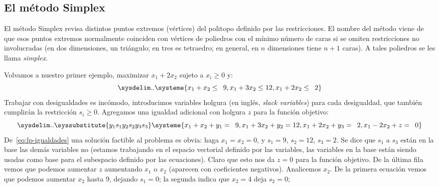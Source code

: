 \subsection{El método Simplex}
\label{sec:simplex}

  El método Simplex revisa distintos puntos extremos
  (vértices)
  del politopo definido por las restricciones.
  El nombre del método
  viene de que esos puntos extremos normalmente coinciden con vértices
  de poliedros con el mínimo número de caras
  si se omiten restricciones no involucradas
  (en dos dimensiones,
   un triángulo;
   en tres es tetraedro;
   en general,
   en \(n\) dimensiones tiene \(n + 1\) caras).
  A tales poliedros se les llama \emph{simplex}.

  Volvamos a nuestro primer ejemplo,
  maximizar \(x_1 + 2 x_2\) sujeto a \(x_i \ge 0\) y:
  \begin{equation}
    \label{eq:lp-restricciones-2}
    \sysdelim..
    \systeme{
         x_1 +	 x_2 \leq \phantom{0}9,
         x_1 + 3 x_2 \leq 12,
      \- x_1 + 2 x_2 \leq \phantom{0}2
    }
  \end{equation}
  Trabajar con desigualdades es incómodo,
  introducimos variables holgura
  (en inglés,
   \emph{\foreignlanguage{english}{slack variables}})
  para cada desigualdad,
  que también cumplirán la restricción \(s_i \ge 0\).
  Agregamos una igualdad adicional con holgura \(z\) para la función objetivo:
  \begin{equation}
    \label{eq:lp-igualdades}
    \sysdelim..
    \syssubstitute{{y_1}{s_1}{y_2}{s_2}{y_3}{s_3}}
    \systeme{
         x_1 +	 x_2 + y_1     = \phantom{0}9,
         x_1 + 3 x_2 + y_2     = 12,
      \- x_1 + 2 x_2 + y_3     = \phantom{0}2,
      \- x_1 - 2 x_2	   + z = \phantom{0}0
    }
  \end{equation}
  De~\eqref{eq:lp-igualdades} una solución factible al problema es obvia:
  haga \(x_1 = x_2 = 0\),
  y \(s_1 = 9\), \(s_2 = 12\), \(s_3 = 2\).
  Se dice que \(s_1\) a \(s_3\) están en la base
  las demás variables no
  (estamos trabajando en el espacio vectorial definido por las variables,
   las variables en la base están siendo usadas como base para el subespacio
   definido por las ecuaciones).
  Claro que esto nos da \(z = 0\) para la función objetivo.
  De la última fila vemos que podemos aumentar \(z\)
  aumentando \(x_1\) o \(x_2\)
  (aparecen con coeficientes negativos).
  Analicemos \(x_2\).
  De la primera ecuación vemos que podemos aumentar \(x_2\) hasta \num{9},
  dejando \(s_1 = 0\);
  la segunda indica que \(x_2 = 4\) deja \(s_2 = 0\);
